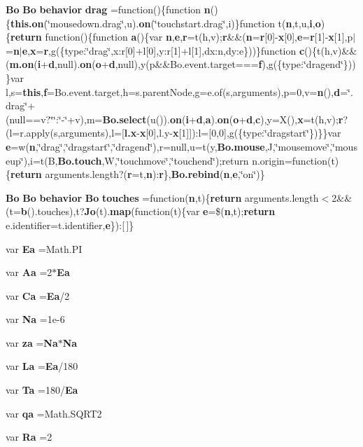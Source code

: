 \begin{DoxyCompactItemize}
{\bf Bo} {\bf Bo} {\bf behavior} {\bf drag} =function()\{function {\bf n}()\{{\bf this.\+on}(\char`\"{}mousedown.\+drag\char`\"{},u).{\bf on}(\char`\"{}touchstart.\+drag\char`\"{},i)\}function t({\bf n},t,u,{\bf i},{\bf o})\{{\bf return} function()\{function {\bf a}()\{var {\bf n},{\bf e},{\bf r}=t(h,v);{\bf r}\&\&({\bf n}={\bf r}[0]-\/{\bf x}[0],{\bf e}={\bf r}[1]-\/{\bf x}[1],p$\vert$={\bf n}$\vert${\bf e},{\bf x}={\bf r},g(\{type\+:\char`\"{}drag\char`\"{},x\+:r[0]+l[0],y\+:r[1]+l[1],dx\+:n,dy\+:e\}))\}function {\bf c}()\{t(h,v)\&\&({\bf m.\+on}({\bf i}+{\bf d},null).{\bf on}({\bf o}+{\bf d},null),y(p\&\&Bo.\+event.\+target==={\bf f}),g(\{type\+:\char`\"{}dragend\char`\"{}\}))\}var l,s={\bf this},{\bf f}=Bo.\+event.\+target,h=s.\+parent\+Node,g=e.\+of(s,arguments),p=0,v={\bf n}(),{\bf d}=\char`\"{}.drag\char`\"{}+(null==v?\char`\"{}\char`\"{}\+:\char`\"{}-\/\char`\"{}+v),m={\bf Bo.\+select}(u()).{\bf on}({\bf i}+{\bf d},{\bf a}).{\bf on}({\bf o}+{\bf d},{\bf c}),y=X(),{\bf x}=t(h,v);{\bf r}?(l=r.\+apply(s,arguments),l=[{\bf l.\+x}-\/{\bf x}[0],l.\+y-\/{\bf x}[1]])\+:l=[0,0],g(\{type\+:\char`\"{}dragstart\char`\"{}\})\}\}var {\bf e}=w({\bf n},\char`\"{}drag\char`\"{},\char`\"{}dragstart\char`\"{},\char`\"{}dragend\char`\"{}),r=null,u=t(y,{\bf Bo.\+mouse},J,\char`\"{}mousemove\char`\"{},\char`\"{}mouseup\char`\"{}),i=t(B,{\bf Bo.\+touch},W,\char`\"{}touchmove\char`\"{},\char`\"{}touchend\char`\"{});return n.\+origin=function(t)\{{\bf return} arguments.\+length?({\bf r}=t,{\bf n})\+:{\bf r}\},{\bf Bo.\+rebind}({\bf n},{\bf e},\char`\"{}on\char`\"{})\}
\item 
{\bf Bo} {\bf Bo} {\bf behavior} {\bf Bo} {\bf touches} =function({\bf n},t)\{{\bf return} arguments.\+length$<$2\&\&(t={\bf b}().touches),t?{\bf Jo}(t).{\bf map}(function(t)\{var {\bf e}=\$({\bf n},t);{\bf return} e.\+identifier=t.\+identifier,{\bf e}\})\+:[$\,$]\}
\item 
var {\bf Ea} =Math.\+P\+I
\item 
var {\bf Aa} =2$\ast${\bf Ea}
\item 
var {\bf Ca} ={\bf Ea}/2
\item 
var {\bf Na} =1e-\/6
\item 
var {\bf za} ={\bf Na}$\ast${\bf Na}
\item 
var {\bf La} ={\bf Ea}/180
\item 
var {\bf Ta} =180/{\bf Ea}
\item 
var {\bf qa} =Math.\+S\+Q\+R\+T2
\item 
var {\bf Ra} =2
\item 

\end{DoxyCompactItemize}
